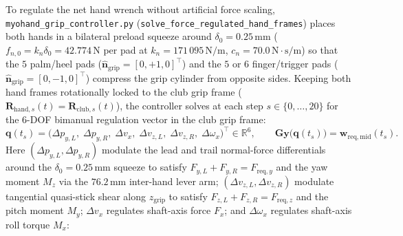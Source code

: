 \documentclass[11pt,a4paper]{article}
\begin{document}
To regulate the net hand wrench without artificial force scaling, \texttt{myohand\_grip\_controller.py} (\texttt{solve\_force\_regulated\_hand\_frames}) places both hands in a bilateral preload squeeze around $\delta_0 = 0.25\,\mathrm{mm}$ ($f_{n,0} = k_n \delta_0 = 42.774\,\mathrm{N}$ per pad at $k_n = 171\,095\,\mathrm{N/m}$, $c_n = 70.0\,\mathrm{N\cdot s/m}$) so that the $5$ palm/heel pads ($\hat{\mathbf{n}}_{\mathrm{grip}} = [0, +1, 0]^{\top}$) and the $5$ or $6$ finger/trigger pads ($\hat{\mathbf{n}}_{\mathrm{grip}} = [0, -1, 0]^{\top}$) compress the grip cylinder from opposite sides. Keeping both hand frames rotationally locked to the club grip frame ($\mathbf{R}_{\mathrm{hand},s}(t) = \mathbf{R}_{\mathrm{club},s}(t)$), the controller solves at each step $s \in \{0, \ldots, 20\}$ for the $6$-DOF bimanual regulation vector in the club grip frame:
\begin{equation}
  \mathbf{q}(t_s) = \bigl(\Delta p_{y,L},\; \Delta p_{y,R},\; \Delta v_x,\; \Delta v_{z,L},\; \Delta v_{z,R},\; \Delta \omega_x\bigr)^{\top} \in \mathbb{R}^6, \qquad
  \mathbf{G}\mathbf{y}\bigl(\mathbf{q}(t_s)\bigr) = \mathbf{w}_{\mathrm{req,mid}}(t_s).
\end{equation}
Here $(\Delta p_{y,L}, \Delta p_{y,R})$ modulate the lead and trail normal-force differentials around the $\delta_0 = 0.25\,\mathrm{mm}$ squeeze to satisfy $F_{y,L} + F_{y,R} = F_{\mathrm{req},y}$ and the yaw moment $M_z$ via the $76.2\,\mathrm{mm}$ inter-hand lever arm; $(\Delta v_{z,L}, \Delta v_{z,R})$ modulate tangential quasi-stick shear along $z_{\mathrm{grip}}$ to satisfy $F_{z,L} + F_{z,R} = F_{\mathrm{req},z}$ and the pitch moment $M_y$; $\Delta v_x$ regulates shaft-axis force $F_x$; and $\Delta \omega_x$ regulates shaft-axis roll torque $M_x$:
\end{document}
